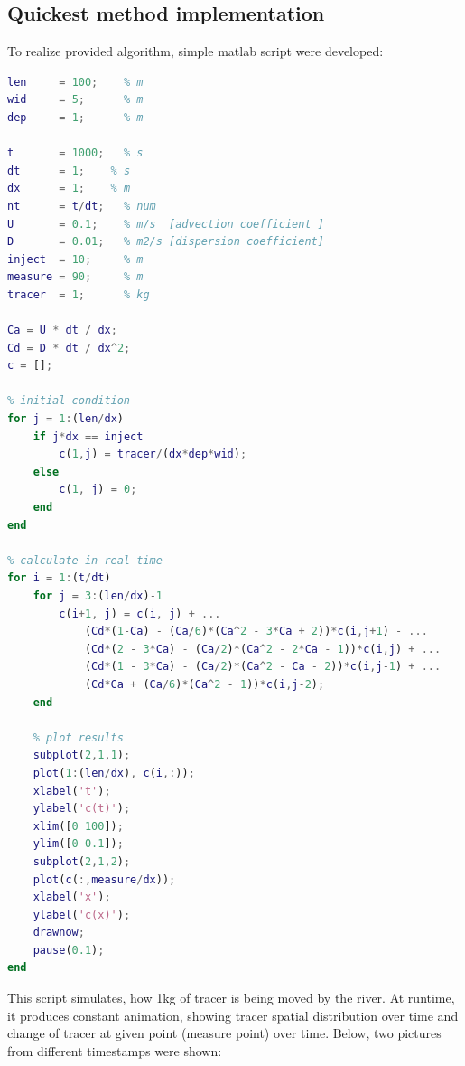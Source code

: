 \documentclass[onecolumn]{article}
\begin{document}
\subsection{Quickest method implementation}
To realize provided algorithm, simple matlab script were developed:
\begin{lstlisting}[language=Matlab,frame=single,label={lst:autocorr},breaklines=true,caption={Matlab script for explicit taylor method}]
% define parameters
len     = 100;    % m
wid     = 5;      % m
dep     = 1;      % m

t       = 1000;   % s
dt      = 1;    % s
dx      = 1;    % m
nt      = t/dt;   % num
U       = 0.1;    % m/s  [advection coefficient ]
D       = 0.01;   % m2/s [dispersion coefficient] 
inject  = 10;     % m
measure = 90;     % m
tracer  = 1;      % kg

Ca = U * dt / dx;
Cd = D * dt / dx^2;
c = [];

% initial condition
for j = 1:(len/dx)
    if j*dx == inject
        c(1,j) = tracer/(dx*dep*wid);
    else
        c(1, j) = 0;
    end
end

% calculate in real time
for i = 1:(t/dt)
    for j = 3:(len/dx)-1
        c(i+1, j) = c(i, j) + ...
            (Cd*(1-Ca) - (Ca/6)*(Ca^2 - 3*Ca + 2))*c(i,j+1) - ...
            (Cd*(2 - 3*Ca) - (Ca/2)*(Ca^2 - 2*Ca - 1))*c(i,j) + ...
            (Cd*(1 - 3*Ca) - (Ca/2)*(Ca^2 - Ca - 2))*c(i,j-1) + ...
            (Cd*Ca + (Ca/6)*(Ca^2 - 1))*c(i,j-2);
    end
    
    % plot results
    subplot(2,1,1);
    plot(1:(len/dx), c(i,:));
    xlabel('t');
    ylabel('c(t)');
    xlim([0 100]);
    ylim([0 0.1]);
    subplot(2,1,2);
    plot(c(:,measure/dx));
    xlabel('x');
    ylabel('c(x)');
    drawnow;
    pause(0.1);
end
\end{lstlisting}
This script simulates, how 1kg of tracer is being moved by the river. At runtime, it produces constant animation, showing tracer spatial distribution over time and change of tracer at given point (measure point) over time.
Below, two pictures from different timestamps were shown:
\end{document}
